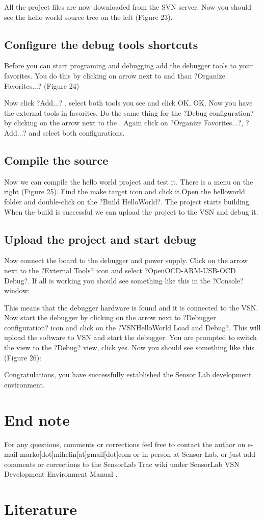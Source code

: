 \documentclass[12pt,a4paper]{article}
\begin{document}
All the project files are now downloaded from the SVN server. Now you should see the hello world source tree on the left (Figure 23).

\subsection{Configure the debug tools shortcuts}
Before you can start programing and debugging add the debugger tools to your favorites. You do this by clicking on  arrow next to  and than ?Organize Favorites...? (Figure 24)

Now click ?Add...? , select both tools you see and click OK, OK. Now you have the external tools in favorites. Do the same thing for the ?Debug configuration? by clicking  on the arrow next to the   . Again click on ?Organize Favorites...?, ?Add...? and select both configurations.

\subsection{Compile the source}
Now we can compile the hello world project and test it. There is a menu on the right (Figure 25). Find the make target icon  and click it.Open the helloworld folder and double-click on the ?Build HelloWorld?. The project starts building.
When the build is successful we can upload the project to the VSN and debug it. 

\subsection{Upload the project and start debug}
Now connect the board to the debugger and power supply. Click on the arrow next to the ?External Tools? icon  and select ?OpenOCD-ARM-USB-OCD Debug?. If all is working you should see something like this in the ?Console? window:

This means that the debugger hardware is found and it is connected to the VSN. Now start the debugger by clicking on the arrow next to ?Debugger configuration? icon  and click on the ?VSNHelloWorld Load and Debug?. This will upload the software to VSN and start the debugger. You are prompted to switch the view to the ?Debug? view, click yes. Now you should see something like this (Figure 26):

Congratulations, you have successfully established the Sensor Lab development environment.

\section{End note}
For any questions, comments or corrections feel free to contact the author on e-mail marko[dot]mihelin[at]gmail[dot]com or in person at Sensor Lab, or just add  comments or corrections to the SensorLab Trac wiki under SensorLab VSN Development Environment Manual .

\section{Literature}
\end{document}

